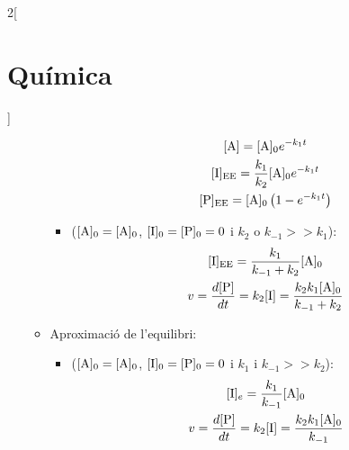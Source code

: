 \documentclass[class=article,10pt,crop=false]{standalone}
\begin{document}
\begin{multicols}{2}[\section{Química}]
\begin{itemize}
\begin{itemize}
\begin{itemize}
\begin{gather*}
                \ce{[A]}=\ce{[A]_0}e^{-k_1t}\\
                \ce{[I]_{EE}}=\frac{k_1}{k_2}\ce{[A]_0}e^{-k_1t}\\
                \ce{[P]_{EE}}=\ce{[A]_0}\left(1-e^{-k_1t}\right)
            \end{gather*}
            \item {} ($\ce{[A]_0}=\ce{[A]_0}$, $\ce{[I]_0}=\ce{[P]_0}=0$ i $k_2\text{ o }k_{-1}>>k_1$):
            \begin{gather*}
                \ce{[I]_{EE}}=\frac{k_1}{k_{-1}+k_2}\ce{[A]_0}\\
                v=\frac{d\ce{[P]}}{dt}=k_2\ce{[I]}=\frac{k_2k_1\ce{[A]_0}}{k_{-1}+k_2}
            \end{gather*}
        \end{itemize}
        \item Aproximació de l'equilibri:
        \begin{itemize}
            \item {} ($\ce{[A]_0}=\ce{[A]_0}$, $\ce{[I]_0}=\ce{[P]_0}=0$ i $k_1$ i $k_{-1}>>k_2$):
            \begin{gather*}
                \ce{[I]_e}=\frac{k_1}{k_{-1}}\ce{[A]_0}\\
                v=\frac{d\ce{[P]}}{dt}=k_2\ce{[I]}=\frac{k_2k_1\ce{[A]_0}}{k_{-1}}
            \end{gather*}
        \end{itemize}
    \end{itemize}
\end{itemize}
\end{multicols}
\end{document}
